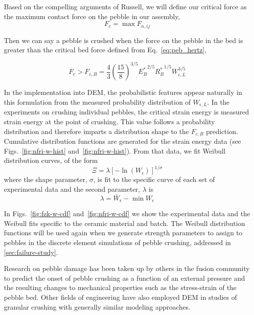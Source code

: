 Based on the compelling arguments of Russell\etal, we will define our critical force as the maximum contact force on the pebble in our assembly,
\begin{equation}
	F_{c} = \max F_{n,ij}
\end{equation}

Then we can say a pebble is crushed when the force on the pebble in the bed is greater than the critical bed force defined from Eq.~\ref{eq:peb_hertz},

\begin{equation}\label{eq:crush-predict}
  F_{c} > F_{c,B} = \frac{4}{3}\left(\frac{15}{8}\right)^{3/5}{E_B^*}^{2/5}{R_B^*}^{1/5}W_{\epsilon,L}^{3/5}
\end{equation}

In the implementation into DEM, the probabilistic features appear naturally in this formulation from the measured probability distribution of $W_{\epsilon,L}$. In the experiments on crushing individual pebbles, the critical strain energy is measured strain energy at the point of crushing. This value follows a probability distribution and therefore imparts a distribution shape to the $F_{c,B}$ prediction. Cumulative distribution functions are generated for the strain energy data (see Figs.~\ref{fig:nfri-w-hist} and~\ref{fig:nfri-w-hist}). From that data, we fit Weibull distribution curves, of the form
\begin{equation}
	\Xi = \lambda\left[-\ln(W_\epsilon)\right]^{1/\sigma}
\end{equation}
where the shape parameter, $\sigma$, is fit to the specific curve of each set of experimental data and the second parameter, $\lambda$ is
\[
\lambda = \bar{W}_\epsilon - \min W_\epsilon
\]

In Figs.~\ref{fig:fzk-w-cdf} and~\ref{fig:nfri-w-cdf} we show the experimental data and the Weibull fits specific to the ceramic material and batch. The Weibull distribution functions will be used again when we generate strength parameters to assign to pebbles in the discrete element simulations of pebble crushing, addressed in \cref{sec:failure-study}.


Research on pebble damage has been taken up by others in the fusion community to predict the onset of pebble crushing as a function of an external pressure and the resulting changes to mechanical properties such as the stress-strain of the pebble bed.\cite{Annabattula2012a, Zhao2012, Zhao2013} Other fields of engineering have also employed DEM in studies of granular crushing with generally similar modeling approaches.\cite{Marketos2007,Pitchumani2004}


